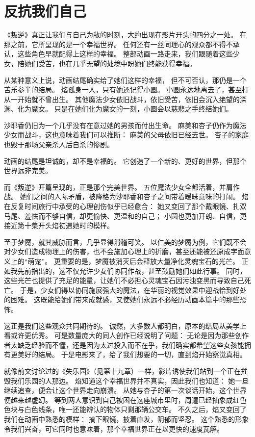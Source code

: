 \chapter{反抗我们自己}
《叛逆》真正让我们与自己为敌的时刻，大约出现在影片开头的四分之一处。
在那之前，它所呈现的是一个幸福世界。
任何还有一丝同理心的观众都不得不承认，这些角色早就配得上这样的幸福。
整部动画一路走来，我们跟随着这些少女，陪她们受苦，也在几乎无望的处境中盼她们终能获得幸福。

从某种意义上说，动画结尾确实给了她们这样的幸福，
但不可否认，那仍是一个苦乐参半的结局。
焰孤身一人，只有她还记得小圆。
小圆永远地离去了，甚至打从一开始就不曾出生。
其他魔法少女依旧战斗，依旧受苦，依旧会沉入绝望的深渊、化为魔女。
只是在她们化为魔女的一刻，小圆会以慈悲之手终结她们。

沙耶香仍旧为一个几乎没有在意过她的男孩而付出生命。
麻美和杏子仍作为魔法少女而战斗，这也意味着我们可以推断：
麻美的父母依旧已经去世。
杏子的家庭也毁于那场父亲杀人后自杀的惨剧。

动画的结尾是坦诚的，却不是幸福的。
它创造了一个新的、更好的世界，但那个世界远非完美。

而《叛逆》开篇呈现的，正是那个完美世界。
五位魔法少女全都活着，并肩作战。
她们之间的人际矛盾，被降格为沙耶香和杏子之间带着暧昧意味的打闹。
焰在反复时间旅行中承受的心理创伤似乎已经愈合：
她又变回了那个戴眼镜、扎双马尾、羞怯而不够自信，却更愉快、更温和的自己；
小圆也更加开朗、自信，更接近第十集开头焰初遇她时的模样。

至于梦魇，就其威胁而言，几乎显得滑稽可笑。
以仁美的梦魇为例，它们既不会对少女们造成物理上的伤害，也不会施加心理上的折磨，甚至还能被还原成字面意义上的“萌宠”。
更重要的是，梦魇被消灭后会释放大量净化灵魂宝石的光芒。
正如我先前指出的，这不仅允许少女们协同作战，甚至鼓励她们如此行事。
同时，这些光芒也提供了充足的能量，让她们不必担心灵魂宝石因污浊变黑而导致自己死亡。
于是，少女们得以协同施展强大的魔法，在华丽的视觉效果中迎战恰到好处的困难。
这既能给她们带来成就感，又使她们永远不必经历动画本篇中的那些恐怖。

这正是我们这些观众共同期待的。
诚然，大多数人都明白，原本的结局从美学上看或许更优秀。
可是数量庞大的同人创作已经说明了问题：
无论是因为那些创作者太缺乏经验而不懂，还是因为太过投入而不在乎，我们确实都希望这些女孩能拥有更美好的结局。
于是电影来了，给了我们想要的一切，直到焰开始察觉真相。

就像前文讨论过的《失乐园》（见第十九章）一样，影片诱使我们站到一个正在摧毁我们乐园的人那边。
焰知道这个幸福世界并不真实，因此我们也知道：
她一旦继续追查，便会让这个世界走向崩溃。
从她与杏子的第一次谈话开始，这个世界便越来越虚幻。
等到两人意识到自己被困在这座城市里时，周遭已经抽象成红色色块与白色线条，唯一还能辨认的物体只剩那辆公交车。
不久之后，焰又变回了我们在动画中熟悉的模样：
摘下眼镜，披着直发，阴郁而坚忍。
这个熟悉的形象令我们兴奋，可它同时也意味着，那个幸福世界正在以更快的速度瓦解。

